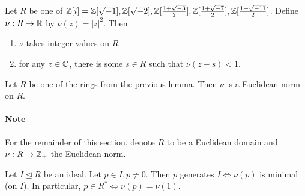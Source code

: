 \begin{lemma}
    Let \(R\) be one of \(\mathbb{Z}[i] = \mathbb{Z}[\sqrt{-1}], \mathbb{Z}[\sqrt{-2}], \mathbb{Z}[\frac{1 + \sqrt{-3}}{2}], \mathbb{Z}[\frac{1 + \sqrt{-7}}{2}], \mathbb{Z}[\frac{1 + \sqrt{-11}}{2}]\). Define \(\nu: R \to \mathbb{R}\) by \(\nu(z) = |z|^2\). Then
    \begin{enumerate}
        \item \(\nu\) takes integer values on \(R\)
        \item for any \(z \in \mathbb{C}\), there is some \(s \in R\) such that \(\nu(z - s) < 1\).
    \end{enumerate}
\end{lemma}

\begin{theorem}
    Let \(R\) be one of the rings from the previous lemma. Then \(\nu\) is a Euclidean norm on \(R\).
\end{theorem}

\paragraph{Note} For the remainder of this section, denote \(R\) to be a Euclidean domain and \(\nu: R \to \mathbb{Z}_+\) the Euclidean norm.

\begin{proposition}
    Let \(I \trianglelefteq R\) be an ideal. Let \(p \in I, p \neq 0\). Then \(p\) generates \(I \iff \nu(p)\) is minimal (on \(I\)). In particular, \(p \in R^* \iff \nu(p) = \nu(1)\).
\end{proposition}

